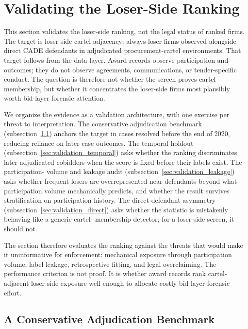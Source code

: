 \section{Validating the Loser-Side Ranking}
\label{sec:validation}

This section validates the loser-side ranking, not the legal
status of ranked firms. The target is loser-side cartel
adjacency: always-loser firms observed alongside direct CADE
defendants in adjudicated procurement-cartel environments. That
target follows from the data layer. Award records observe
participation and outcomes; they do not observe agreements,
communications, or tender-specific conduct. The question is
therefore not whether the screen proves cartel membership, but
whether it concentrates the loser-side firms most plausibly
worth bid-layer forensic attention.

We organize the evidence as a validation architecture, with one
exercise per threat to interpretation. The conservative
adjudication benchmark
(subsection~\ref{sec:validation_conservative}) anchors the
target in cases resolved before the end of 2020, reducing
reliance on later case outcomes. The temporal holdout
(subsection~\ref{sec:validation_temporal}) asks whether the
ranking discriminates later-adjudicated cobidders when the
score is fixed before their labels exist. The participation-
volume and leakage audit
(subsection~\ref{sec:validation_leakage}) asks whether frequent
losers are overrepresented near defendants beyond what
participation volume mechanically predicts, and whether the
result survives stratification on participation history. The
direct-defendant asymmetry
(subsection~\ref{sec:validation_direct}) asks whether the
statistic is mistakenly behaving like a generic cartel-
membership detector; for a loser-side screen, it should not.

The section therefore evaluates the ranking against the threats
that would make it uninformative for enforcement: mechanical
exposure through participation volume, label leakage,
retrospective fitting, and legal overclaiming. The performance
criterion is not proof. It is whether award records rank
cartel-adjacent loser-side exposure well enough to allocate
costly bid-layer forensic effort.

\subsection{A Conservative Adjudication Benchmark}
\label{sec:validation_conservative}

